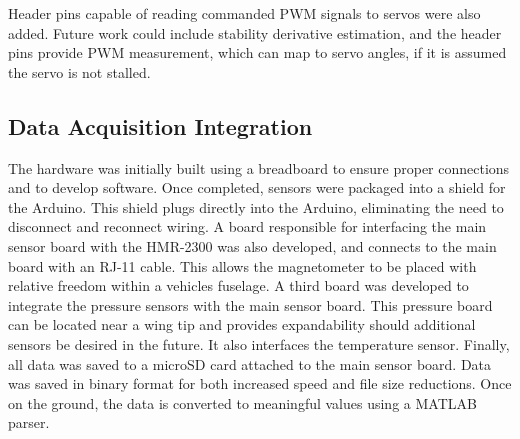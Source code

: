 Header pins capable of reading commanded PWM signals to servos were also added. Future work could include stability derivative estimation, and the header pins provide PWM measurement, which can map to servo angles, if it is assumed the servo is not stalled. 

\subsection{Data Acquisition Integration}
The hardware was initially built using a breadboard to ensure proper connections and to develop software. Once completed, sensors were packaged into a shield for the Arduino. This shield plugs directly into the Arduino, eliminating the need to disconnect and reconnect wiring. A board responsible for interfacing the main sensor board with the HMR-2300 was also developed, and connects to the main board with an RJ-11 cable. This allows the magnetometer to be placed with relative freedom within a vehicles fuselage. A third board was developed to integrate the pressure sensors with the main sensor board. This pressure board can be located near a wing tip and  provides expandability should additional sensors be desired in the future. It also interfaces the temperature sensor. Finally, all data was saved to a microSD card attached to the main sensor board. Data was saved in binary format for both increased speed and file size reductions. Once on the ground, the data is converted to meaningful values using a MATLAB parser.
